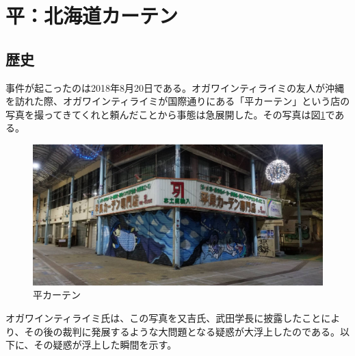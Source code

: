 \section{平：北海道カーテン}

\subsection{歴史}
事件が起こったのは2018年8月20日である。オガワインティライミの友人が沖縄を訪れた際、オガワインティライミが国際通りにある「平カーテン」という店の写真を撮ってきてくれと頼んだことから事態は急展開した。その写真は図\ref{tairakaten}である。


\begin{figure}[H]
  \centering
  \includegraphics[clip,scale=0.2]{./section/Taira/figures/tairakaten.jpg}
  \caption{平カーテン}
\label{tairakaten}
\end{figure}

オガワインティライミ氏は、この写真を又吉氏、武田学長に披露したことにより、その後の裁判に発展するような大問題となる疑惑が大浮上したのである。以下に、その疑惑が浮上した瞬間を示す。\par


